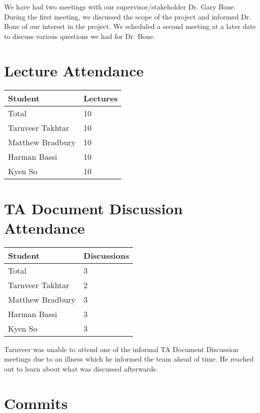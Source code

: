 \documentclass{article}
\begin{document}
We have had two meetings with our supervisor/stakeholder Dr. Gary Bone. During the first meeting, we discussed the scope of the project and informed Dr. Bone of our interest in the project. 
We scheduled a second meeting at a later date to discuss various questions we had for Dr. Bone.

\section{Lecture Attendance}

\begin{table}[H]
\centering
\begin{tabular}{ll}
\toprule
\textbf{Student} & \textbf{Lectures}\\
\midrule
Total & 10\\
Tarnveer Takhtar & 10\\
Matthew Bradbury & 10\\
Harman Bassi & 10\\
Kyen So & 10\\
\bottomrule
\end{tabular}
\end{table}


\section{TA Document Discussion Attendance}


\begin{table}[H]
\centering
\begin{tabular}{ll}
\toprule
\textbf{Student} & \textbf{Discussions}\\
\midrule
Total & 3\\
Tarnveer Takhtar & 2\\
Matthew Bradbury & 3\\
Harman Bassi & 3\\
Kyen So & 3\\
\bottomrule
\end{tabular}
\end{table}

Tarnveer was unable to attend one of the informal TA Document Discussion meetings due to an illness which he informed the team ahead of time. 
He reached out to learn about what was discussed afterwards.

\section{Commits}
\end{document}
